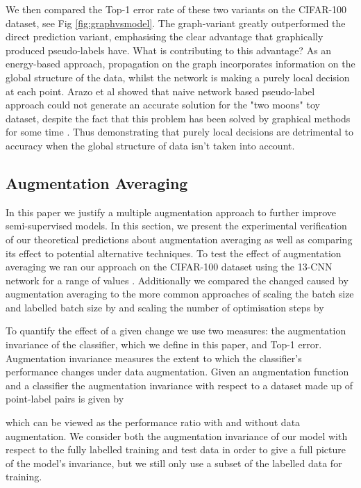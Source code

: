 \documentclass[journal]{IEEEtran}
\begin{document}
We then compared the Top-1 error rate of these two variants on the CIFAR-100 dataset, see Fig \ref{fig:graphvsmodel}. The graph-variant greatly outperformed the direct prediction variant, emphasising the clear advantage that graphically produced pseudo-labels have. What is contributing to this advantage? As an energy-based approach, propagation on the graph incorporates information on the global structure of the data, whilst the network is making a purely local decision at each point. Arazo et al \cite{arazo2019pseudo} showed that naive network based pseudo-label approach could not generate an accurate solution for the "two moons" toy dataset, despite the fact that this problem has been solved by graphical methods for some time \cite{zhu2003semi}. Thus demonstrating that purely local decisions are detrimental to accuracy when the global structure of data isn't taken into account.



\subsection{Augmentation Averaging}
In this paper we justify a multiple augmentation approach to further improve semi-supervised models. In this section, we present the experimental verification of our theoretical predictions about augmentation averaging as well as comparing its effect to potential alternative techniques. To test the effect of augmentation averaging we ran our approach on the CIFAR-100 dataset using the 13-CNN network for a range of values . Additionally we compared the changed caused by augmentation averaging to the more common approaches of scaling the batch size  and labelled batch size  by  and scaling the number of optimisation steps  by 



To quantify the effect of a given change we use two measures: the augmentation invariance of the classifier, which we define in this paper, and Top-1 error. Augmentation invariance measures the extent to which the classifier's performance changes under data augmentation. Given an augmentation function  and a classifier  the augmentation invariance  with respect to a dataset  made up of  point-label pairs  is given by



\noindent which can be viewed as the performance ratio with and without data augmentation. We consider both the augmentation invariance of our model with respect to the fully labelled training and test data in order to give a full picture of the model's invariance, but we still only use a subset of the labelled data for training. 
\end{document}
